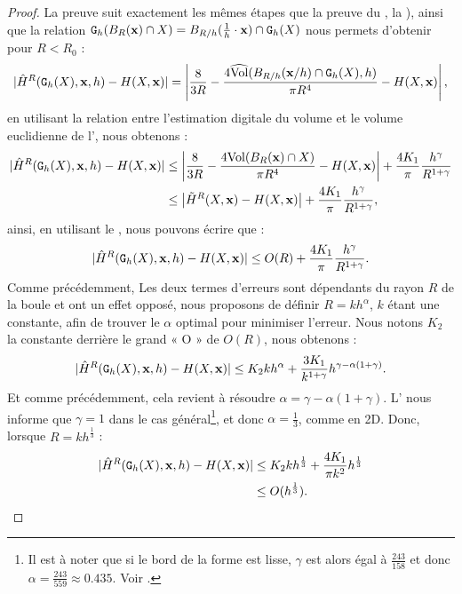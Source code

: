 \begin{proof}
  La preuve suit exactement les mêmes étapes que la preuve du
  , la
  ), ainsi que la relation
  $\DigF{\Ball{R}{\vx} \cap \Shape}{h}=\Ball{R/h}{\frac{1}{h} \cdot \vx} \cap \DSh$ nous
  permets d'obtenir pour $R < R_0$ :
  \begin{equation}
    | \MeanCurvH{R}(\DSh,\vx,h) - \MeanCurv(\Shape,\vx) |
    = \left|\frac{8}{3R}-\frac{4\VolC(\Ball{R/h}{\vx / h} \cap \DSh, h)}{\pi R^4} - \MeanCurv(\Shape,\vx) \right|,
  \end{equation}
  en utilisant la relation entre l'estimation digitale du volume et le volume
  euclidienne de l', nous obtenons :
  \begin{align}\label{eq-meancurvhat-error-bound-prelim}
    | \MeanCurvH{R}(\DSh,\vx,h) - \MeanCurv(\Shape,\vx) |
    &\le \left|\frac{8}{3R}-\frac{4\Vol(\Ball{R}{\vx} \cap \Shape)}{\pi R^4} - \MeanCurv(\Shape,\vx) \right| + \frac{4 K_1}{\pi} \frac{h^\gamma}{R^{1+\gamma}} \nonumber \\
    &\le \left|\MeanCurvT{R}(\Shape,\vx) - \MeanCurv(\Shape,\vx) \right| + \frac{4 K_1}{\pi} \frac{h^\gamma}{R^{1+\gamma}},
  \end{align}
  ainsi, en utilisant le , nous pouvons
  écrire que :
  \begin{equation}\label{eq-meancurvhat-error-bound-prelim2}
    | \MeanCurvH{R}(\DSh,\vx,h) - \MeanCurv(\Shape,\vx) |
    \le O(R) + \frac{4 K_1}{\pi} \frac{h^\gamma}{R^{1+\gamma}}.
  \end{equation}
  Comme précédemment, Les deux termes d'erreurs sont dépendants du rayon $R$ de
  la boule et ont un effet opposé, nous proposons de définir $R = k h^{\alpha}$,
  $k$ étant une constante, afin de trouver le $\alpha$ optimal pour minimiser
  l'erreur. Nous notons $K_2$ la constante derrière le grand « O » de $O(R)$,
  nous obtenons :
  \begin{equation}\label{eq-meancurvhat-error-bound-prelim3}
    | \MeanCurvH{R}(\DSh,\vx,h) - \MeanCurv(\Shape,\vx) |
    \le K_2kh^\alpha + \frac{3K_1}{k^{1+\gamma}}h^{\gamma - \alpha(1+\gamma)}.
  \end{equation}
  Et comme précédemment, cela revient à résoudre $\alpha = \gamma -
  \alpha(1+\gamma)$. L' nous informe que
  $\gamma = 1$ dans le cas général\footnote{Il est à noter que si le bord de la
  forme est lisse, $\gamma$ est alors égal à $\frac{243}{158}$ et donc $\alpha =
  \frac{243}{559} \approx 0.435$. Voir .}, et
  donc $\alpha = \frac{1}{3}$, comme en 2D. Donc, lorsque $R=kh^{\frac{1}{3}}$ :
  \begin{align}\label{eq-meancurvhat-error-bound-prelim4}
    | \MeanCurvH{R}(\DSh,\vx,h) - \MeanCurv(\Shape,\vx) |
    &\le K_2kh^\frac{1}{3} + \frac{4K_1}{\pi k^2}h^{\frac{1}{3}}\\
    &\le O(h^\frac{1}{3}).
  \end{align}
\end{proof}
